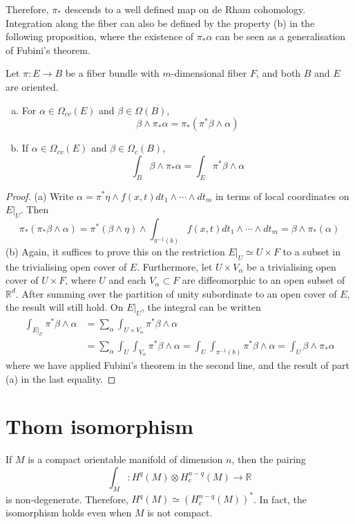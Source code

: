 Therefore, $\pi_*$ descends to a well defined map on de Rham cohomology. 
Integration along the fiber can also be defined by the property (b) in the
following proposition, where the existence of $\pi_*\alpha$ can be seen as a 
generalisation of Fubini's theorem.
\begin{prop} %
	\label{prop:projection_formula}
	Let $\pi : E \to B$ be a fiber bundle with  $m$-dimensional fiber $F$, and
	both $B$ and  $E$ are oriented. 
	\begin{enumerate}[(a), leftmargin=\parindent]
	    \item For $\alpha\in \Omega_{cv}(E)$ and $\beta\in\Omega(B)$, 
	\[
		\beta\wedge \pi_*\alpha = \pi_*(\pi^*\beta\wedge\alpha)  
	\] 
		\item If $\alpha \in \Omega_{cv}(E)$ and $\beta\in \Omega_{c}(B)$,
			\[
			\int_B \beta\wedge \pi_*\alpha =  \int_E \pi^*\beta\wedge\alpha
			\] 
	\end{enumerate}
\end{prop}
\begin{proof}
	(a) Write $\alpha = \pi^*\eta \wedge f(x,t) dt_1\wedge\cdots\wedge dt_m $
	in terms of local coordinates on $E|_U$. Then 
	\[
	\pi_*(\pi_*\beta\wedge \alpha)
	=\pi^*(\beta\wedge\eta)\wedge \int_{\pi^{-1}(b)}f(x,t) 
	dt_1\wedge\cdots\wedge dt_m 	
	= \beta\wedge\pi_*(\alpha)
	\] 
	(b) Again, it suffices to prove this on the restriction $E|_U\simeq U\times F$ to a
	subset in the trivialising open cover of $E$. Furthermore,
	let $U\times V_\alpha$ be a trivialising open cover of $U\times F$, 
	where $U$ and each $V_{\alpha}\subset F$ are diffeomorphic to an open subset of
	$\mathbb{R}^d$. After summing over the partition of unity
	subordinate to an open cover of $E$, 
	the result will still hold. On $E|_U$, the integral can be written
	\begin{align*}
		\int_{E|_U} \pi^*\beta\wedge \alpha
		&= \sum_\alpha\int_{U \times V_\alpha}\pi^*\beta\wedge \alpha \\
		&= \sum_\alpha\int_{U}\int_{V_\alpha}\pi^*\beta\wedge \alpha
		= \int_{U}\int_{\pi^{-1}(b)}\pi^*\beta\wedge \alpha
		= \int_{U}\beta\wedge \pi_*\alpha 
	\end{align*}
	where we have applied Fubini's theorem in the second line, and the result of
	part (a) in the last equality.
\end{proof}


\section{Thom isomorphism}
\begin{thm} 
	\label{thm:poincare_duality}
	If $M$ is a compact orientable manifold of dimension $n$, then the pairing 
	\[
	\int_M : H^q(M)\otimes H_c^{n-q}(M) \to \mathbb{R}
	\] 
	is non-degenerate. Therefore, $H^q(M)\simeq (H^{n-q}_c(M))^*$. 
	In fact, the isomorphism holds even when $M$ is not compact.
\end{thm}


